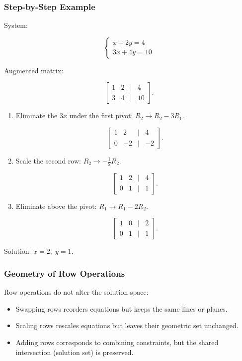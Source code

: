 \documentclass[
  letterpaper,
  DIV=11,
  numbers=noendperiod]{scrreprt}
\providecommand{\tightlist}{%
  \setlength{\itemsep}{0pt}\setlength{\parskip}{0pt}}
\begin{document}
\subsubsection{Step-by-Step Example}\label{step-by-step-example}

System:

\[
\begin{cases}  
x + 2y = 4 \\  
3x + 4y = 10  
\end{cases}
\]

Augmented matrix:

\[
\begin{bmatrix}  
1 & 2 & | & 4 \\  
3 & 4 & | & 10  
\end{bmatrix}.
\]

\begin{enumerate}
\def\labelenumi{\arabic{enumi}.}
\item
  Eliminate the \(3x\) under the first pivot: \(R_2 \to R_2 - 3R_1\).

  \[
  \begin{bmatrix}  
  1 & 2 & | & 4 \\  
  0 & -2 & | & -2  
  \end{bmatrix}.
  \]
\item
  Scale the second row: \(R_2 \to -\tfrac{1}{2}R_2\).

  \[
  \begin{bmatrix}  
  1 & 2 & | & 4 \\  
  0 & 1 & | & 1  
  \end{bmatrix}.
  \]
\item
  Eliminate above the pivot: \(R_1 \to R_1 - 2R_2\).

  \[
  \begin{bmatrix}  
  1 & 0 & | & 2 \\  
  0 & 1 & | & 1  
  \end{bmatrix}.
  \]
\end{enumerate}

Solution: \(x = 2, \; y = 1\).

\subsubsection{Geometry of Row
Operations}\label{geometry-of-row-operations}

Row operations do not alter the solution space:

\begin{itemize}
\tightlist
\item
  Swapping rows reorders equations but keeps the same lines or planes.
\item
  Scaling rows rescales equations but leaves their geometric set
  unchanged.
\item
  Adding rows corresponds to combining constraints, but the shared
  intersection (solution set) is preserved.
\end{itemize}
\end{document}
